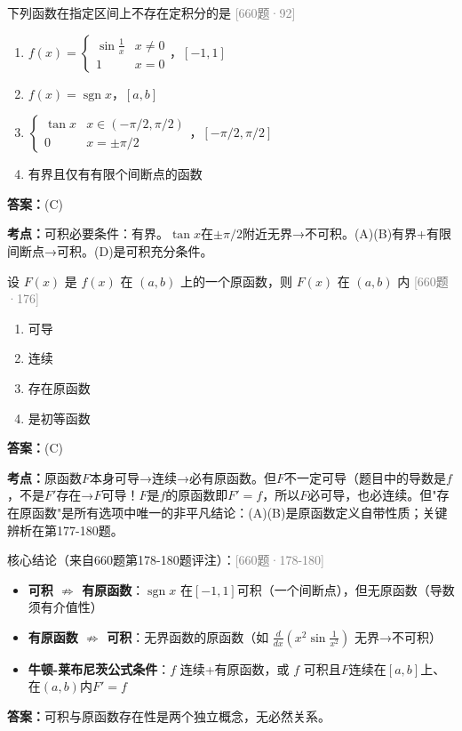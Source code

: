 \documentclass[12pt,a4paper]{ctexbook}
\newcommand{\src}[1]{\hfill\textcolor{gray}{\small\textsf{[#1]}}}
\newcommand{\ans}[1]{\begin{answerbox}\textbf{答案：}#1\end{answerbox}}
\newcommand{\kpt}[1]{\textbf{考点：}#1}
\begin{document}
\bigskip

\begin{exercise}[660题·定积分存在性·92]
下列函数在指定区间上不存在定积分的是 \hfill\src{660题·92}
\begin{enumerate}[label=(\Alph*),nosep]
  \item $f(x)=\begin{cases}\sin\frac{1}{x}&x\neq 0\\1&x=0\end{cases}$，$[-1,1]$
  \item $f(x)=\operatorname{sgn}x$，$[a,b]$
  \item $\begin{cases}\tan x&x\in(-\pi/2,\pi/2)\\0&x=\pm\pi/2\end{cases}$，$[-\pi/2,\pi/2]$
  \item 有界且仅有有限个间断点的函数
\end{enumerate}
\end{exercise}
\ans{(C)}
\kpt{可积必要条件：有界。$\tan x$在$\pm\pi/2$附近无界→不可积。(A)(B)有界+有限间断点→可积。(D)是可积充分条件。}

\bigskip

\begin{exercise}[660题·原函数性质·176]
设 $F(x)$ 是 $f(x)$ 在 $(a,b)$ 上的一个原函数，则 $F(x)$ 在 $(a,b)$ 内 \hfill\src{660题·176}
\begin{enumerate}[label=(\Alph*),nosep]
  \item 可导
  \item 连续
  \item 存在原函数
  \item 是初等函数
\end{enumerate}
\end{exercise}
\ans{(C)}
\kpt{原函数$F$本身可导→连续→必有原函数。但$F$不一定可导（题目中的导数是$f$，不是$F'$存在→$F$可导！$F$是$f$的原函数即$F'=f$，所以$F$必可导，也必连续。但"存在原函数"是所有选项中唯一的非平凡结论：(A)(B)是原函数定义自带性质；关键辨析在第177-180题。}

\bigskip

\begin{exercise}[660题·原函数 vs 可积·178-180]
核心结论（来自660题第178-180题评注）：\hfill\src{660题·178-180}
\begin{itemize}[nosep]
  \item \textbf{可积 $\not\Rightarrow$ 有原函数}：$\operatorname{sgn}x$ 在$[-1,1]$可积（一个间断点），但无原函数（导数须有介值性）
  \item \textbf{有原函数 $\not\Rightarrow$ 可积}：无界函数的原函数（如 $\frac{d}{dx}(x^2\sin\frac{1}{x^2})$ 无界→不可积）
  \item \textbf{牛顿-莱布尼茨公式条件}：$f$ 连续+有原函数，或 $f$ 可积且$F$连续在$[a,b]$上、在$(a,b)$内$F'=f$
\end{itemize}
\end{exercise}
\ans{可积与原函数存在性是两个独立概念，无必然关系。}
\end{document}
